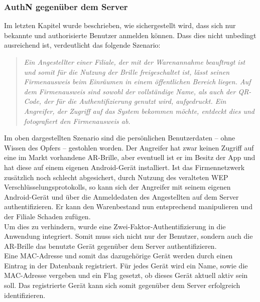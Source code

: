 \subsubsection{\acs{AuthN} gegenüber dem Server}
\label{cha:authn_server}
Im letzten Kapitel wurde beschrieben, wie sichergestellt wird, dass sich nur bekannte und authorisierte Benutzer anmelden können. Dass dies nicht unbedingt ausreichend ist, verdeutlicht das folgende Szenario:
\begin{quote}
\textit{Ein Angestellter einer Filiale, der mit der Warenannahme beauftragt ist und somit für die Nutzung der Brille freigeschaltet ist, lässt seinen Firmenausweis beim Einräumen in einem öffentlichen Bereich liegen. Auf dem Firmenausweis sind sowohl der vollständige Name, als auch der QR-Code, der für die Authentifizierung genutzt wird, aufgedruckt. Ein Angreifer, der Zugriff auf das System bekommen möchte, entdeckt dies und fotografiert den Firmenausweis ab.}
\end{quote}
Im oben dargestellten Szenario sind die persönlichen Benutzerdaten -- ohne Wissen des Opfers -- gestohlen worden. Der Angreifer hat zwar keinen Zugriff auf eine im Markt vorhandene \ac{AR}-Brille, aber eventuell ist er im Besitz der App und hat diese auf einem eigenen Android-Gerät installiert. Ist das Firmennetzwerk zusätzlich noch schlecht abgesichert, \zB durch Nutzung des veralteten \ac{WEP} Verschlüsselungsprotokolls, so kann sich der Angreifer mit seinem eigenen Android-Gerät und über die Anmeldedaten des Angestellten auf dem Server authentifizieren. Er kann den Warenbestand nun entsprechend manipulieren und der Filiale Schaden zufügen.\\

Um dies zu verhindern, wurde eine Zwei-Faktor-Authentifizierung in die Anwendung integriert. Somit muss sich nicht nur der Benutzer, sondern auch die \ac{AR}-Brille \bzw das benutzte Gerät gegenüber dem Server authentifizieren.\\
Eine \ac{MAC}-Adresse und somit das dazugehörige Gerät werden durch einen Eintrag in der Datenbank registriert. Für jedes Gerät wird ein Name, sowie die \ac{MAC}-Adresse vergeben und ein Flag gesetzt, ob dieses Gerät aktuell aktiv sein soll. Das registrierte Gerät kann sich somit gegenüber dem Server erfolgreich identifizieren.\\


